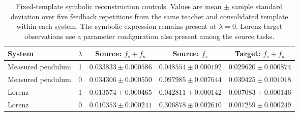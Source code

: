 \begin{table}[!ht]
\centering\small
\caption{Fixed-template symbolic reconstruction controls. Values are mean $\pm$ sample standard deviation over five feedback repetitions from the same teacher and consolidated template within each system. The symbolic expression remains present at $\lambda=0$. Lorenz target observations use a parameter configuration also present among the source tasks.}
\label{tab:paired_regularizer}
\setlength{\tabcolsep}{4pt}
\begin{tabular}{lcccc}
\toprule
System & $\lambda$ & Source: $f_s+f_n$ & Source: $f_s$ & Target: $f_s+f_n$ \\
\midrule
Measured pendulum & 1 & $0.033833 \pm 0.000586$ & $0.048554 \pm 0.000192$ & $0.029620 \pm 0.000874$ \\
Measured pendulum & 0 & $0.034306 \pm 0.000550$ & $0.097985 \pm 0.007644$ & $0.030425 \pm 0.001018$ \\
Lorenz & 1 & $0.013574 \pm 0.000465$ & $0.042811 \pm 0.000142$ & $0.007083 \pm 0.000146$ \\
Lorenz & 0 & $0.010353 \pm 0.000241$ & $0.306878 \pm 0.002610$ & $0.007259 \pm 0.000249$ \\
\bottomrule
\end{tabular}
\end{table}

